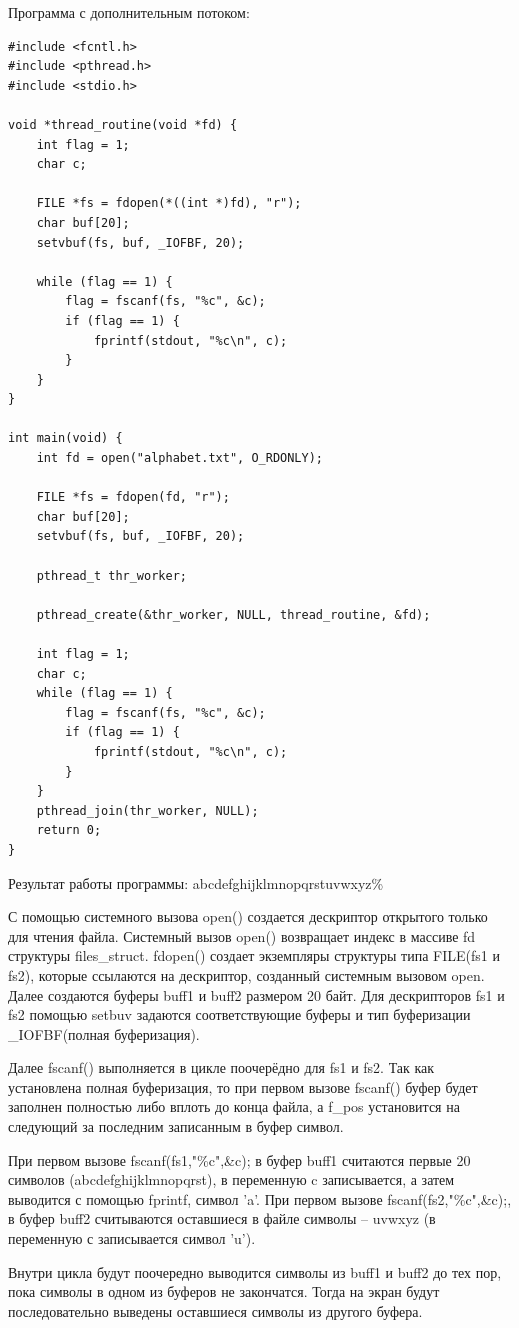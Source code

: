 Программа с дополнительным потоком:\newpage
\begin{lstlisting}
#include <fcntl.h>
#include <pthread.h>
#include <stdio.h>

void *thread_routine(void *fd) {
	int flag = 1;
	char c;
	
	FILE *fs = fdopen(*((int *)fd), "r");
	char buf[20];
	setvbuf(fs, buf, _IOFBF, 20);
	
	while (flag == 1) {
		flag = fscanf(fs, "%c", &c);
		if (flag == 1) {
			fprintf(stdout, "%c\n", c);
		}
	}
}

int main(void) {
	int fd = open("alphabet.txt", O_RDONLY);
	
	FILE *fs = fdopen(fd, "r");
	char buf[20];
	setvbuf(fs, buf, _IOFBF, 20);
	
	pthread_t thr_worker;
	
	pthread_create(&thr_worker, NULL, thread_routine, &fd);
	
	int flag = 1;
	char c;
	while (flag == 1) {
		flag = fscanf(fs, "%c", &c);
		if (flag == 1) {
			fprintf(stdout, "%c\n", c);
		}
	}
	pthread_join(thr_worker, NULL);
	return 0;
}
\end{lstlisting}

Результат работы программы:
abcdefghijklmnopqrstuvwxyz\%

\newpage
С помощью системного вызова open() создается дескриптор открытого только для чтения файла. Системный вызов open() возвращает индекс в массиве fd структуры files\_struct. fdopen() создает экземпляры структуры типа FILE(fs1 и fs2), которые ссылаются на дескриптор, созданный системным вызовом open.
Далее создаются буферы  buff1 и buff2 размером 20 байт. Для дескрипторов fs1 и fs2 помощью setbuv задаются соответствующие буферы и тип буферизации \_IOFBF(полная буферизация).

Далее fscanf() выполняется в цикле поочерёдно для fs1 и  fs2. Так как установлена полная буферизация, то при первом вызове fscanf() буфер будет заполнен полностью либо вплоть до конца файла, а f\_pos установится на следующий за последним записанным в буфер символ.

При первом вызове fscanf(fs1,"\%c",\&c); в буфер buff1 считаются первые 20 символов (abcdefghijklmnopqrst), в переменную c записывается, а затем выводится с помощью fprintf, символ 'a'. При первом вызове fscanf(fs2,"\%c",\&c);, в буфер buff2 считываются оставшиеся в файле символы – uvwxyz (в переменную с записывается символ 'u').  

Внутри цикла будут поочередно выводится символы из buff1 и buff2 до тех пор, пока символы в одном из буферов не закончатся. Тогда на экран будут последовательно выведены оставшиеся символы из другого буфера. 

